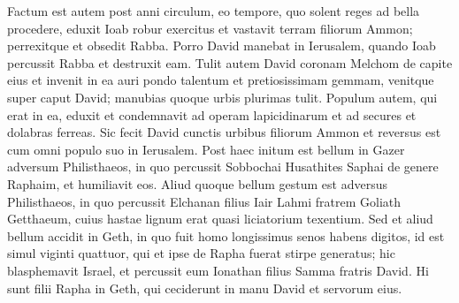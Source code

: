 \begin{biblechapter}  
\verse Factum est autem post anni circulum, eo tempore, quo solent reges ad bella procedere, eduxit Ioab robur exercitus et vastavit terram filiorum Ammon; perrexitque et obsedit Rabba. Porro David manebat in Ierusalem, quando Ioab percussit Rabba et destruxit eam. 
\verse Tulit autem David coronam Melchom de capite eius et invenit in ea auri pondo talentum et pretiosissimam gemmam, venitque super caput David; manubias quoque urbis plurimas tulit. 
\verse Populum autem, qui erat in ea, eduxit et condemnavit ad operam lapicidinarum et ad secures et dolabras ferreas. Sic fecit David cunctis urbibus filiorum Ammon et reversus est cum omni populo suo in Ierusalem. 
\verse Post haec initum est bellum in Gazer adversum Philisthaeos, in quo percussit Sobbochai Husathites Saphai de genere Raphaim, et humiliavit eos. 
\verse Aliud quoque bellum gestum est adversus Philisthaeos, in quo percussit Elchanan filius Iair Lahmi fratrem Goliath Getthaeum, cuius hastae lignum erat quasi liciatorium texentium. 
\verse Sed et aliud bellum accidit in Geth, in quo fuit homo longissimus senos habens digitos, id est simul viginti quattuor, qui et ipse de Rapha fuerat stirpe generatus; 
\verse hic blasphemavit Israel, et percussit eum Ionathan filius Samma fratris David. Hi sunt filii Rapha in Geth, qui ceciderunt in manu David et servorum eius. 
\end{biblechapter}

